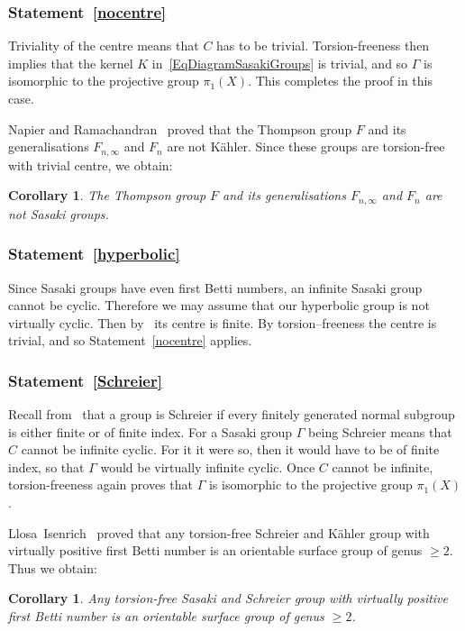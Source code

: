 \documentclass[12pt,leqno]{amsart}
\newtheorem{cor}[theor]{Corollary}
\begin{document}
\subsubsection*{Statement~\ref{nocentre}}

Triviality of the centre means that $C$ has to be trivial. Torsion-freeness then implies that
the kernel $K$ in~\eqref{EqDiagramSasakiGroups} is trivial, and so $\Gamma$ is isomorphic 
to the projective group $\pi_1(X)$. This completes the proof in this case.

Napier and Ramachandran~\cite{Napier} proved that the Thompson group $F$ and its generalisations $F_{n,\infty}$ and $F_n$ 
are not K\"ahler. Since these groups are torsion-free with trivial centre, we obtain:
\begin{cor}
	The Thompson group $F$ and its generalisations $F_{n,\infty}$ and $F_n$ are not Sasaki groups.
\end{cor}

\subsubsection*{Statement~\ref{hyperbolic}}

Since Sasaki groups have even first Betti numbers, an infinite Sasaki group cannot be cyclic.
Therefore we may assume that our hyperbolic group is not 
virtually cyclic. Then by~\cite[Lemma~3.5]{KL} its centre is finite. By torsion--freeness the centre
is trivial, and so Statement~\ref{nocentre} applies.

\subsubsection*{Statement~\ref{Schreier}}

Recall from~\cite[Definition~3.1]{HarpeKot} that a group is Schreier if every finitely generated normal 
subgroup is either finite or of finite index. For a Sasaki group $\Gamma$ 
being Schreier means that $C$ cannot be infinite cyclic. For it it were so, then it would have to be of 
finite index, so that $\Gamma$ would be virtually infinite cyclic. Once $C$ cannot be infinite, torsion-freeness 
again proves that  $\Gamma$ is isomorphic to the projective group $\pi_1(X)$.

Llosa~Isenrich~\cite[Corollary~3.2.9]{Llosa} proved that any torsion-free Schreier and K\"ahler group
with virtually positive first Betti number is an orientable surface group of genus $\geq 2$. Thus we
obtain:
\begin{cor}
Any torsion-free Sasaki and Schreier group with virtually positive first Betti number is 
an orientable surface group of genus $\geq 2$. 
	\end{cor}
\end{document}
